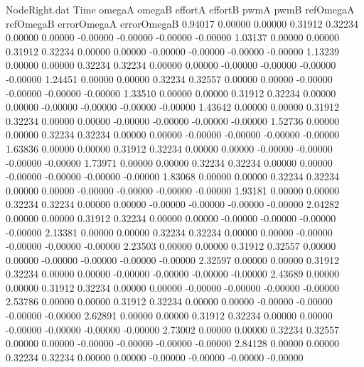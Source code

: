 \begin{filecontents}{NodeRight.dat}
Time omegaA omegaB effortA effortB pwmA pwmB refOmegaA refOmegaB errorOmegaA errorOmegaB
   0.94017    0.00000    0.00000     0.31912    0.32234    0.00000    0.00000   -0.00000   -0.00000   -0.00000   -0.00000
   1.03137    0.00000    0.00000     0.31912    0.32234    0.00000    0.00000   -0.00000   -0.00000   -0.00000   -0.00000
   1.13239    0.00000    0.00000     0.32234    0.32234    0.00000    0.00000   -0.00000   -0.00000   -0.00000   -0.00000
   1.24451    0.00000    0.00000     0.32234    0.32557    0.00000    0.00000   -0.00000   -0.00000   -0.00000   -0.00000
   1.33510    0.00000    0.00000     0.31912    0.32234    0.00000    0.00000   -0.00000   -0.00000   -0.00000   -0.00000
   1.43642    0.00000    0.00000     0.31912    0.32234    0.00000    0.00000   -0.00000   -0.00000   -0.00000   -0.00000
   1.52736    0.00000    0.00000     0.32234    0.32234    0.00000    0.00000   -0.00000   -0.00000   -0.00000   -0.00000
   1.63836    0.00000    0.00000     0.31912    0.32234    0.00000    0.00000   -0.00000   -0.00000   -0.00000   -0.00000
   1.73971    0.00000    0.00000     0.32234    0.32234    0.00000    0.00000   -0.00000   -0.00000   -0.00000   -0.00000
   1.83068    0.00000    0.00000     0.32234    0.32234    0.00000    0.00000   -0.00000   -0.00000   -0.00000   -0.00000
   1.93181    0.00000    0.00000     0.32234    0.32234    0.00000    0.00000   -0.00000   -0.00000   -0.00000   -0.00000
   2.04282    0.00000    0.00000     0.31912    0.32234    0.00000    0.00000   -0.00000   -0.00000   -0.00000   -0.00000
   2.13381    0.00000    0.00000     0.32234    0.32234    0.00000    0.00000   -0.00000   -0.00000   -0.00000   -0.00000
   2.23503    0.00000    0.00000     0.31912    0.32557    0.00000    0.00000   -0.00000   -0.00000   -0.00000   -0.00000
   2.32597    0.00000    0.00000     0.31912    0.32234    0.00000    0.00000   -0.00000   -0.00000   -0.00000   -0.00000
   2.43689    0.00000    0.00000     0.31912    0.32234    0.00000    0.00000   -0.00000   -0.00000   -0.00000   -0.00000
   2.53786    0.00000    0.00000     0.31912    0.32234    0.00000    0.00000   -0.00000   -0.00000   -0.00000   -0.00000
   2.62891    0.00000    0.00000     0.31912    0.32234    0.00000    0.00000   -0.00000   -0.00000   -0.00000   -0.00000
   2.73002    0.00000    0.00000     0.32234    0.32557    0.00000    0.00000   -0.00000   -0.00000   -0.00000   -0.00000
   2.84128    0.00000    0.00000     0.32234    0.32234    0.00000    0.00000   -0.00000   -0.00000   -0.00000   -0.00000

\end{filecontents}
